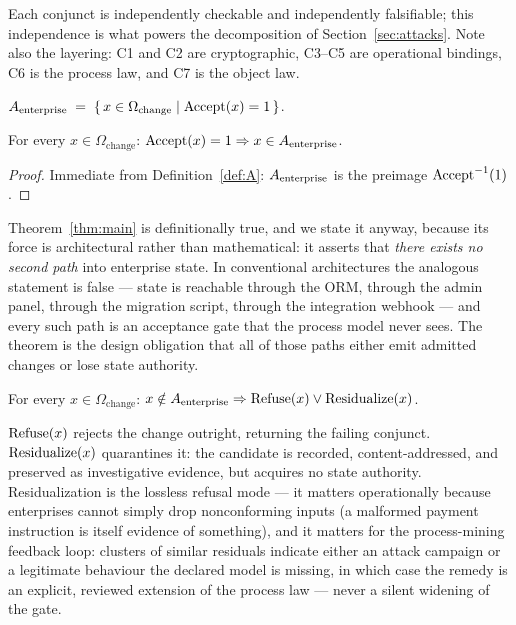 Each conjunct is independently checkable and independently falsifiable; this
independence is what powers the decomposition of Section~\ref{sec:attacks}.
Note also the layering: C1 and C2 are cryptographic, C3--C5 are operational
bindings, C6 is the process law, and C7 is the object law.

\begin{definition}
\label{def:A}
$A_{\mathrm{enterprise}} \;=\; \{\, x \in \Omega_{\mathrm{change}} \mid \operatorname{Accept}(x) = 1 \,\}$.
\end{definition}

\begin{theorem}
\label{thm:main}
For every $x \in \Omega_{\mathrm{change}}$:
$\operatorname{Accept}(x) = 1 \Rightarrow x \in A_{\mathrm{enterprise}}$.
\end{theorem}
\begin{proof}
Immediate from Definition~\ref{def:A}: $A_{\mathrm{enterprise}}$ is the preimage
$\operatorname{Accept}^{-1}(1)$.
\end{proof}

Theorem~\ref{thm:main} is definitionally true, and we state it anyway, because
its force is architectural rather than mathematical: it asserts that
\emph{there exists no second path} into enterprise state. In conventional
architectures the analogous statement is false --- state is reachable through
the ORM, through the admin panel, through the migration script, through the
integration webhook --- and every such path is an acceptance gate that the
process model never sees. The theorem is the design obligation that all of
those paths either emit admitted changes or lose state authority.

\begin{corollary}
\label{cor:refuse}
For every $x \in \Omega_{\mathrm{change}}$:
$x \notin A_{\mathrm{enterprise}} \Rightarrow \operatorname{Refuse}(x) \vee \operatorname{Residualize}(x)$.
\end{corollary}

$\operatorname{Refuse}(x)$ rejects the change outright, returning the failing conjunct.
$\operatorname{Residualize}(x)$ quarantines it: the candidate is recorded, content-addressed,
and preserved as investigative evidence, but acquires no state authority.
Residualization is the lossless refusal mode --- it matters operationally
because enterprises cannot simply drop nonconforming inputs (a malformed
payment instruction is itself evidence of something), and it matters for the
process-mining feedback loop: clusters of similar residuals indicate either an
attack campaign or a legitimate behaviour the declared model is missing, in
which case the remedy is an explicit, reviewed extension of the process law ---
never a silent widening of the gate.

